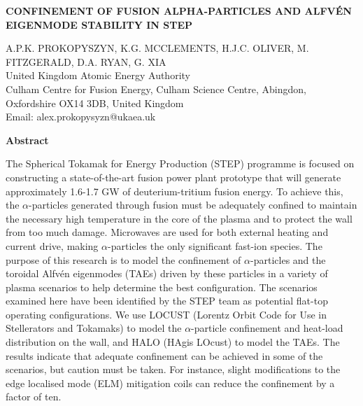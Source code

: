 \documentclass[10pt, a4paper, twoside]{article}
\begin{document}
\begin{flushleft}
\fontsize{12}{14}\selectfont \textbf{CONFINEMENT OF FUSION ALPHA-PARTICLES AND ALFV\'EN EIGENMODE STABILITY IN STEP}

\fontsize{10}{13}\selectfont
A.P.K. PROKOPYSZYN, K.G. MCCLEMENTS, H.J.C. OLIVER, M. FITZGERALD, D.A. RYAN, G. XIA \\
United Kingdom Atomic Energy Authority \\
Culham Centre for Fusion Energy, Culham Science Centre, Abingdon, Oxfordshire OX14 3DB, United Kingdom \\
Email: alex.prokopysyzn@ukaea.uk

\end{flushleft}

\begin{flushleft}
\textbf{Abstract}
\end{flushleft}

\setlength{\parindent}{1cm}
\fontsize{9}{12pt}\selectfont

The Spherical Tokamak for Energy Production (STEP) programme is focused on constructing a state-of-the-art fusion power plant prototype that will generate approximately 1.6-1.7 GW of deuterium-tritium fusion energy. To achieve this, the $\alpha$-particles generated through fusion must be adequately confined to maintain the necessary high temperature in the core of the plasma and to protect the wall from too much damage. Microwaves are used for both external heating and current drive, making $\alpha$-particles the only significant fast-ion species. The purpose of this research is to model the confinement of $\alpha$-particles and the toroidal Alfvén eigenmodes (TAEs) driven by these particles in a variety of plasma scenarios to help determine the best configuration. The scenarios examined here have been identified by the STEP team as potential flat-top operating configurations. We use LOCUST (Lorentz Orbit Code for Use in Stellerators and Tokamaks) to model the $\alpha$-particle confinement and heat-load distribution on the wall, and HALO (HAgis LOcust) to model the TAEs. The results indicate that adequate confinement can be achieved in some of the scenarios, but caution must be taken. For instance, slight modifications to the edge localised mode (ELM) mitigation coils can reduce the confinement by a factor of ten.

\setlength{\parindent}{0pt}
\fontsize{10}{13}\selectfont
\end{document}
